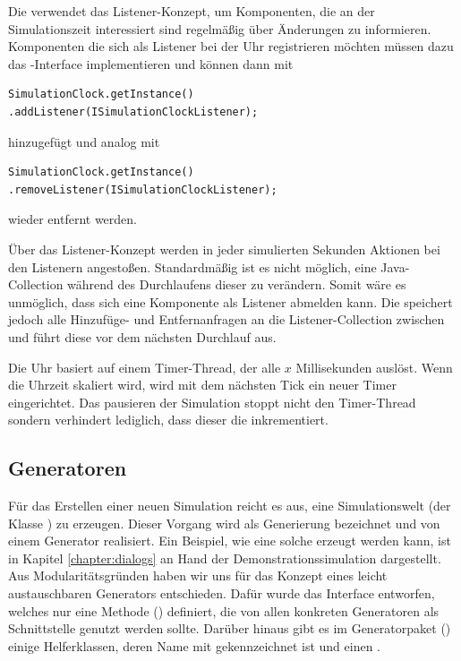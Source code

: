 Die  verwendet das Listener-Konzept, um Komponenten, die an der Simulationszeit interessiert sind regelmäßig über Änderungen zu informieren. Komponenten die sich als Listener bei der Uhr registrieren möchten müssen dazu das -Interface implementieren und können dann mit \begin{lstlisting}
SimulationClock.getInstance()
.addListener(ISimulationClockListener);
\end{lstlisting}
hinzugefügt und analog mit
\begin{lstlisting}
SimulationClock.getInstance()
.removeListener(ISimulationClockListener);
\end{lstlisting}
wieder entfernt werden.

Über das Listener-Konzept werden in jeder simulierten Sekunden Aktionen bei den Listenern angestoßen. Standardmäßig ist es nicht möglich, eine Java-Collection während des Durchlaufens dieser zu verändern. Somit wäre es unmöglich, dass sich eine Komponente als Listener abmelden kann. Die  speichert jedoch alle Hinzufüge- und Entfernanfragen an die Listener-Collection zwischen und führt diese vor dem nächsten Durchlauf aus.

Die Uhr basiert auf einem Timer-Thread, der alle $x$ Millisekunden auslöst. Wenn die Uhrzeit skaliert wird, wird mit dem nächsten Tick ein neuer Timer eingerichtet. Das pausieren der Simulation stoppt nicht den Timer-Thread sondern verhindert lediglich, dass dieser die  inkrementiert.


\subsection{Generatoren}\label{subsec:real_generator}
Für das Erstellen einer neuen Simulation reicht es aus, eine Simulationswelt (der Klasse ) zu erzeugen. Dieser Vorgang wird als Generierung bezeichnet und von einem Generator realisiert.
Ein Beispiel, wie eine solche erzeugt werden kann, ist in Kapitel  \ref{chapter:dialogs} an Hand der Demonstrationssimulation dargestellt.\\ 

Aus Modularitätsgründen haben wir uns für das Konzept eines leicht austauschbaren Generators entschieden. Dafür wurde das Interface  entworfen, welches nur eine Methode () definiert, die von allen konkreten Generatoren als Schnittstelle genutzt werden sollte.
Darüber hinaus gibt es im Generatorpaket () einige Helferklassen, deren Name mit  gekennzeichnet ist und einen .\\

